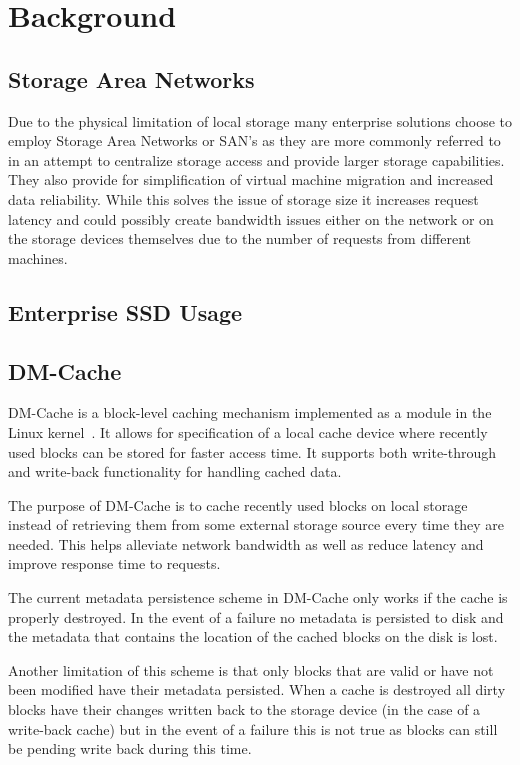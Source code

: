 \section{Background}

\subsection{Storage Area Networks}

Due to the physical limitation of local storage many enterprise
solutions choose to employ Storage Area Networks or SAN's as they are
more commonly referred to in an attempt to centralize storage access
and provide larger storage capabilities. They also provide for
simplification of virtual machine migration and increased data
reliability. While this solves the issue of storage size it increases
request latency and could possibly create bandwidth issues either on
the network or on the storage devices themselves due to the number of
requests from different machines.

\subsection{Enterprise SSD Usage}

\subsection{DM-Cache}

DM-Cache is a block-level caching mechanism implemented as a module in
the Linux kernel~\cite{DM-Cache}. It allows for specification of a
local cache device where recently used blocks can be stored for faster
access time. It supports both write-through and write-back
functionality for handling cached data.

The purpose of DM-Cache is to cache recently used blocks on local
storage instead of retrieving them from some external storage source
every time they are needed. This helps alleviate network bandwidth as
well as reduce latency and improve response time to requests.

The current metadata persistence scheme in DM-Cache only works if the
cache is properly destroyed. In the event of a failure no metadata is
persisted to disk and the metadata that contains the location of the
cached blocks on the disk is lost.

Another limitation of this scheme is that only blocks that are valid
or have not been modified have their metadata persisted. When a cache
is destroyed all dirty blocks have their changes written back to the
storage device (in the case of a write-back cache) but in the event of
a failure this is not true as blocks can still be pending write back
during this time.
